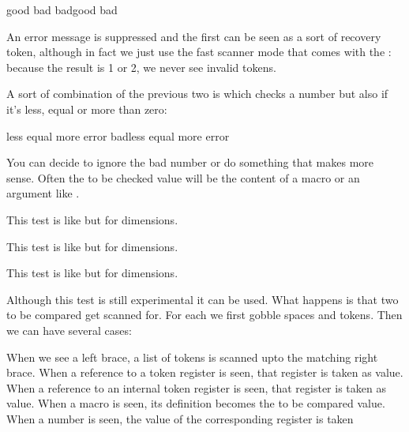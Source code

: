 \starttyping[option=TEX]
\or good \else bad \fi
\ifchknum bad\or good \else bad \fi
\stoptyping

An error message is suppressed and the first \type {\or} can be seen as a sort of
recovery token, although in fact we just use the fast scanner mode that comes
with the \type {\ifcase}: because the result is 1 or 2, we never see invalid
tokens.

\stopsubsection

\startsubsection[title={\tex{ifnumval}}]

A sort of combination of the previous two is \type {\ifnumval} which checks a
number but also if it's less, equal or more than zero:

\starttyping[option=TEX]
\or less \or equal \or more \else error \fi
\ifnumval bad\or less \or equal \or more \else error \fi
\stoptyping

You can decide to ignore the bad number or do something that makes more sense.
Often the to be checked value will be the content of a macro or an argument like
.

\stopsubsection

\startsubsection[title={\tex{ifcmpdim}}]

This test is like \type {\ifcmpnum} but for dimensions.

\stopsubsection

\startsubsection[title={\tex{ifchkdim}}]

This test is like \type {\ifchknum} but for dimensions.

\stopsubsection

\startsubsection[title={\tex{ifdimval}}]

This test is like \type {\ifnumval} but for dimensions.

\stopsubsection

\startsubsection[title={\tex{iftok}}]

Although this test is still experimental it can be used. What happens is that
two to be compared  get scanned for. For each we first gobble
spaces and \type {\relax} tokens. Then we can have several cases:

\startitemize[n,packed]
    \startitem
        When we see a left brace, a list of tokens is scanned upto the
        matching right brace.
    \stopitem
    \startitem
        When a reference to a token register is seen, that register is taken as
        value.
    \stopitem
    \startitem
        When a reference to an internal token register is seen, that register is
        taken as value.
    \stopitem
    \startitem
        When a macro is seen, its definition becomes the to be compared value.
    \stopitem
    \startitem
        When a number is seen, the value of the corresponding register is taken
    \stopitem
\stopitemize

